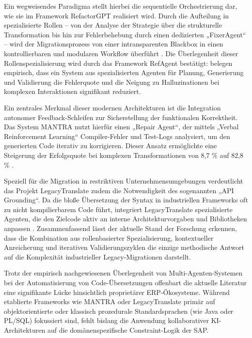 Ein wegweisendes Paradigma stellt hierbei die sequentielle Orchestrierung dar, wie sie im Framework 
RefactorGPT realisiert wird. Durch die Aufteilung in spezialisierte Rollen – von der Analyse der 
Strategie über die strukturelle Transformation bis hin zur Fehlerbehebung durch einen dedizierten 
„FixerAgent“ – wird der Migrationsprozess von einer intransparenten Blackbox in einen 
kontrollierbaren und modularen Workflow überführt \parencite{karabiyikRefactorGPTChatGPTbasedMultiagent2025}. 
Die Überlegenheit dieser Rollenspezialisierung wird durch das Framework RefAgent bestätigt: 
\textcite{oueslatiRefAgentMultiagentLLMbased2026} belegen empirisch, dass ein System aus 
spezialisierten Agenten für Planung, Generierung und Validierung die Fehlerquote und die Neigung 
zu Halluzinationen bei komplexen Interaktionen signifikant reduziert.

Ein zentrales Merkmal dieser modernen Architekturen ist die Integration autonomer Feedback-Schleifen
zur Sicherstellung der funktionalen Korrektheit. Das System MANTRA nutzt hierfür einen 
„Repair Agent“, der mittels „Verbal Reinforcement Learning“ Compiler-Fehler und Test-Logs 
analysiert, um den generierten Code iterativ zu korrigieren. Dieser Ansatz ermöglichte eine 
Steigerung der Erfolgsquote bei komplexen Transformationen von 8,7 \% auf 82,8 \% \parencite{xuMANTRAEnhancingAutomated2025}.

Speziell für die Migration in restriktiven Unternehmensumgebungen verdeutlicht das Projekt 
LegacyTranslate \textcite{motiLegacyTranslateLLMbasedMultiAgent2026} zudem die Notwendigkeit des 
sogenannten „API Grounding“. 
Da die bloße Übersetzung der Syntax in industriellen Frameworks oft zu nicht kompilierbarem Code 
führt, integriert LegacyTranslate spezialisierte Agenten, die den Zielcode aktiv an interne 
Architekturvorgaben und Bibliotheken anpassen \parencite{motiLegacyTranslateLLMbasedMultiAgent2026}. Zusammenfassend lässt der 
aktuelle Stand der Forschung erkennen, dass die Kombination aus rollenbasierter Spezialisierung, 
kontextueller Anreicherung und iterativen Validierungszyklen die einzige methodische Antwort auf 
die Komplexität industrieller Legacy-Migrationen darstellt.


Trotz der empirisch nachgewiesenen Überlegenheit von Multi-Agenten-Systemen bei der Automatisierung 
von Code-Übersetzungen offenbart die aktuelle Literatur eine signifikante Lücke hinsichtlich 
proprietärer ERP-Ökosysteme. Während etablierte Frameworks wie MANTRA \textcite{xuMANTRAEnhancingAutomated2025} 
oder LegacyTranslate \textcite{motiLegacyTranslateLLMbasedMultiAgent2026} primär auf 
objektorientierte oder klassisch prozedurale Standardsprachen (wie Java oder PL/SQL) 
fokussiert sind, fehlt bislang die Anwendung kollaborativer KI-Architekturen auf die 
domänenspezifische Constraint-Logik der SAP.

